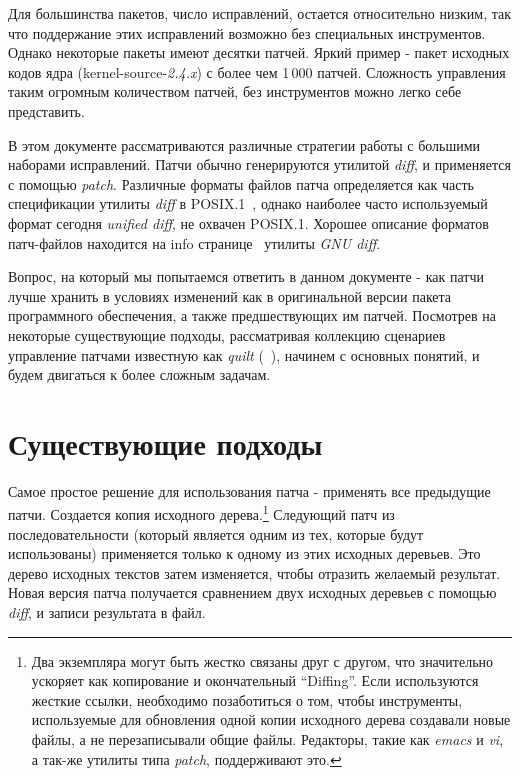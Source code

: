 \documentclass{article}
\newcommand{\prog}[1]{\textit{#1}}
\begin{document}
Для большинства пакетов, число исправлений, остается относительно низким, так что поддержание этих исправлений возможно без специальных инструментов. Однако некоторые пакеты имеют десятки патчей. Яркий пример - пакет исходных кодов ядра (kernel-source-\textit{2.4.x}) с более чем 1\,000 патчей. Сложность управления таким огромным количеством патчей, без инструментов можно легко себе представить.

В этом документе рассматриваются различные стратегии работы с большими наборами исправлений. Патчи обычно генерируются утилитой \prog{diff}, и применяется с помощью \prog{patch}. Различные форматы файлов патча определяется как часть спецификации утилиты \prog{diff} в POSIX.1~\cite{posix-2001-diff}, однако наиболее часто используемый формат сегодня \textit{unified diff}, не охвачен POSIX.1. Хорошее описание форматов патч-файлов находится на info странице~\cite{info-diff} утилиты \prog{GNU diff}.

Вопрос, на который мы попытаемся ответить в данном документе -  как патчи лучше хранить в условиях изменений как в оригинальной версии пакета программного обеспечения, а также предшествующих им патчей. Посмотрев на некоторые существующие подходы, рассматривая коллекцию сценариев управление патчами известную как \textit{quilt} (~\cite{quilt}), начинем с основных понятий, и будем двигаться к более сложным задачам.



\section{Существующие подходы}
\label{sec:existing}

Самое простое решение для использования патча - применять все предыдущие патчи.
Создается копия исходного дерева.\footnote{
Два экземпляра могут быть жестко связаны друг с другом, что
значительно ускоряет как копирование и окончательный
``Diffing''. Если используются жесткие ссылки, необходимо позаботиться о том, чтобы инструменты, используемые для обновления одной копии исходного дерева создавали новые файлы, а не перезаписывали общие файлы. Редакторы, такие как \prog{emacs} и \prog{vi}, а так-же утилиты типа \prog{patch}, поддерживают это.} Следующий патч из последовательности (который является одним из тех, которые будут использованы) применяется только к одному из этих исходных деревьев. Это дерево исходных текстов затем изменяется, чтобы отразить желаемый результат. Новая версия патча получается сравнением двух исходных деревьев с помощью \prog{diff}, и записи результата в файл.
\end{document}
